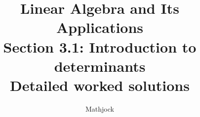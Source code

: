 
\title{\textbf{Linear Algebra and Its Applications}\\[0.3em]Section 3.1: Introduction to determinants\\[0.3em]\large Detailed worked solutions}
\author{Mathjock}
\date{}

\maketitle
\bookinfo
\tableofcontents
\clearpage
\renewcommand{\thesection}{3.\arabic{section}}
\renewcommand{\theHsection}{3.\arabic{section}}
\setcounter{section}{0}


